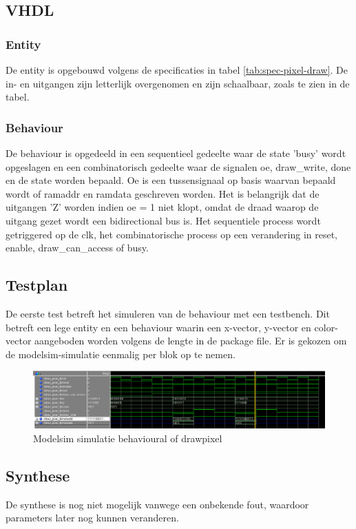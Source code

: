 \documentclass{scrartcl} %
\begin{document}
\subsection{VHDL}
\label{ssec:vhdl_dp}
\subsubsection{Entity}
De entity is opgebouwd volgens de specificaties in tabel \ref{tab:spec-pixel-draw}. De in- en uitgangen zijn letterlijk overgenomen en zijn schaalbaar, zoals te zien in de tabel. 

\subsubsection{Behaviour}
De behaviour is opgedeeld in een sequentieel gedeelte waar de state 'busy' wordt opgeslagen en een combinatorisch gedeelte waar de signalen oe, draw\_write, done en de state worden bepaald. Oe is een tussensignaal op basis waarvan bepaald wordt of ramaddr en ramdata geschreven worden. Het is belangrijk dat de uitgangen 'Z' worden indien oe = 1 niet klopt, omdat de draad waarop de uitgang gezet wordt een bidirectional bus is. Het sequentiele process wordt getriggered op de clk, het combinatorische process op een verandering in reset, enable, draw\_can\_access of busy. 

\subsection{Testplan}
De eerste test betreft het simuleren van de behaviour met een testbench. Dit betreft een lege entity en een behaviour waarin een x-vector, y-vector en color-vector aangeboden worden volgens de lengte in de package file. Er is gekozen om de modelsim-simulatie eenmalig per blok op te nemen. 
\begin{figure} [h!]
\centering
\includegraphics [scale = 0.7] {resource/dp_sim}
\caption{Modelsim simulatie behavioural of drawpixel}
\label{fig:dp_sim}
\end{figure}

\subsection{Synthese}
De synthese is nog niet mogelijk vanwege een onbekende fout, waardoor parameters later nog kunnen veranderen. 
\end{document}

